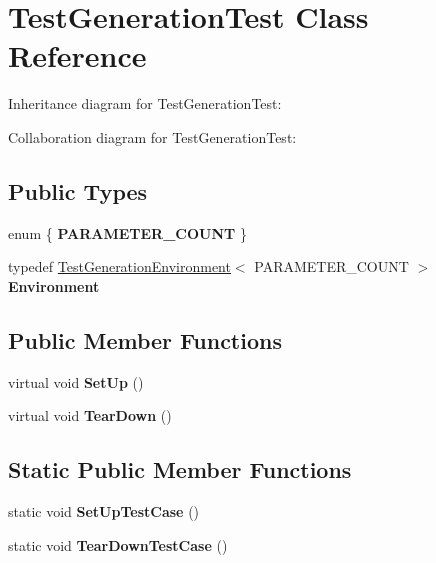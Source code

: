 \hypertarget{classTestGenerationTest}{}\section{Test\+Generation\+Test Class Reference}
\label{classTestGenerationTest}


Inheritance diagram for Test\+Generation\+Test\+:


Collaboration diagram for Test\+Generation\+Test\+:
\subsection*{Public Types}
\begin{DoxyCompactItemize}
\item 
\mbox{\label{classTestGenerationTest_a42cdf2314eecc9a27690ee4a3da82a7f}} 
enum \{ {\bfseries P\+A\+R\+A\+M\+E\+T\+E\+R\+\_\+\+C\+O\+U\+NT}
 \}
\item 
\mbox{\label{classTestGenerationTest_aeff004d79bbb376d7acecd28f9fb71c6}} 
typedef \hyperlink{classTestGenerationEnvironment}{Test\+Generation\+Environment}$<$ P\+A\+R\+A\+M\+E\+T\+E\+R\+\_\+\+C\+O\+U\+NT $>$ {\bfseries Environment}
\end{DoxyCompactItemize}
\subsection*{Public Member Functions}
\begin{DoxyCompactItemize}
\item 
\mbox{\label{classTestGenerationTest_a9705d633439b360b338503599a360ea8}} 
virtual void {\bfseries Set\+Up} ()
\item 
\mbox{\label{classTestGenerationTest_a447190a74b306b4b94c25fed474d6029}} 
virtual void {\bfseries Tear\+Down} ()
\end{DoxyCompactItemize}
\subsection*{Static Public Member Functions}
\begin{DoxyCompactItemize}
\item 
\mbox{\label{classTestGenerationTest_a3e1681e93e14b17fe923e763d88940cb}} 
static void {\bfseries Set\+Up\+Test\+Case} ()
\item 
\mbox{\label{classTestGenerationTest_ab0f077f3b881d66e3676741761222732}} 
static void {\bfseries Tear\+Down\+Test\+Case} ()
\end{DoxyCompactItemize}
